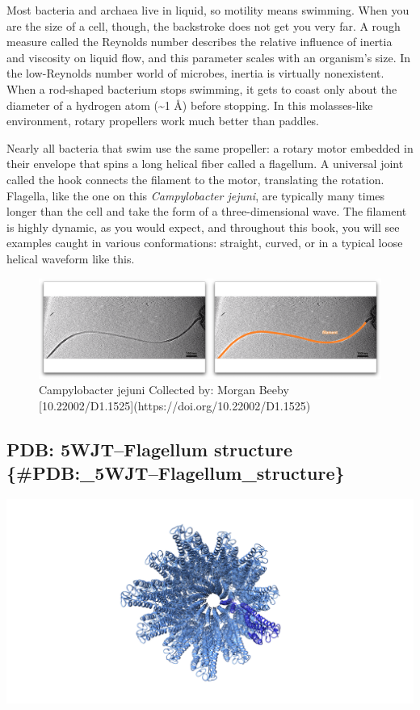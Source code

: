 \documentclass[]{tufte-book}
\begin{document}
Most bacteria and archaea live in liquid, so motility means swimming.
When you are the size of a cell, though, the backstroke does not get you
very far. A rough measure called the Reynolds number describes the
relative influence of inertia and viscosity on liquid flow, and this
parameter scales with an organism's size. In the low-Reynolds number
world of microbes, inertia is virtually nonexistent. When a rod-shaped
bacterium stops swimming, it gets to coast only about the diameter of a
hydrogen atom (\textasciitilde{}1 Å) before stopping. In this
molasses-like environment, rotary propellers work much better than
paddles.

Nearly all bacteria that swim use the same propeller: a rotary motor
embedded in their envelope that spins a long helical fiber called a
flagellum. A universal joint called the hook connects the filament to
the motor, translating the rotation. Flagella, like the one on this
\emph{Campylobacter jejuni}, are typically many times longer than the
cell and take the form of a three-dimensional wave. The filament is
highly dynamic, as you would expect, and throughout this book, you will
see examples caught in various conformations: straight, curved, or in a
typical loose helical waveform like this.

\begin{figure}
\includegraphics{movie_stills/6_1} \caption[Campylobacter jejuni Collected by]{Campylobacter jejuni Collected by: Morgan Beeby [10.22002/D1.1525](https://doi.org/10.22002/D1.1525)}\label{fig:unnamed-chunk-99}
\end{figure}

\subsection{PDB: 5WJT--Flagellum structure
\{\#PDB:\_5WJT--Flagellum\_structure\}}\label{pdb-5wjtflagellum-structure-pdb_5wjtflagellum_structure}

\includegraphics{img/schematics/6_1_1}
\end{document}
